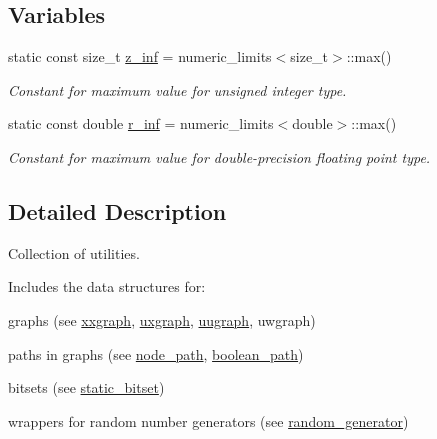 \subsection*{Variables}
\begin{DoxyCompactItemize}
\item 
static const size\+\_\+t \hyperlink{namespacelgraph_1_1utils_a3db646ea6b211c71a055e53066513ebb}{z\+\_\+inf} = numeric\+\_\+limits$<$size\+\_\+t$>$\+::max()\hypertarget{namespacelgraph_1_1utils_a3db646ea6b211c71a055e53066513ebb}{}\label{namespacelgraph_1_1utils_a3db646ea6b211c71a055e53066513ebb}

\begin{DoxyCompactList}\small\item\em Constant for maximum value for unsigned integer type. \end{DoxyCompactList}\item 
static const double \hyperlink{namespacelgraph_1_1utils_aff1de7a502334a782aa94275b61cf307}{r\+\_\+inf} = numeric\+\_\+limits$<$double$>$\+::max()\hypertarget{namespacelgraph_1_1utils_aff1de7a502334a782aa94275b61cf307}{}\label{namespacelgraph_1_1utils_aff1de7a502334a782aa94275b61cf307}

\begin{DoxyCompactList}\small\item\em Constant for maximum value for double-\/precision floating point type. \end{DoxyCompactList}\end{DoxyCompactItemize}


\subsection{Detailed Description}
Collection of utilities. 

Includes the data structures for\+:
\begin{DoxyItemize}
\item graphs (see \hyperlink{classlgraph_1_1utils_1_1xxgraph}{xxgraph}, \hyperlink{classlgraph_1_1utils_1_1uxgraph}{uxgraph}, \hyperlink{classlgraph_1_1utils_1_1uugraph}{uugraph}, uwgraph)
\item paths in graphs (see \hyperlink{classlgraph_1_1utils_1_1node__path}{node\+\_\+path}, \hyperlink{classlgraph_1_1utils_1_1boolean__path}{boolean\+\_\+path})
\item bitsets (see \hyperlink{classlgraph_1_1utils_1_1static__bitset}{static\+\_\+bitset})
\item wrappers for random number generators (see \hyperlink{classlgraph_1_1utils_1_1random__generator}{random\+\_\+generator})
\end{DoxyItemize}

